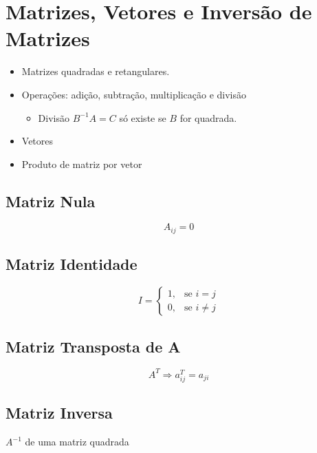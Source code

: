 \section{Matrizes, Vetores e Inversão de Matrizes}

\begin{itemize}

\item Matrizes quadradas e retangulares.

\item Operações: adição, subtração, multiplicação e divisão

\begin{itemize}
 \item Divisão $B^{-1}A = C$ só existe se $B$ for quadrada.
\end{itemize}

\item Vetores

\item Produto de matriz por vetor

\end{itemize}

\subsection{Matriz Nula}

\[ A_{ij} = 0\]

\subsection{Matriz Identidade}

\[
  I =
  \left\{
    \begin{array}{ll}
      1, & \mbox{se $i = j$} \\
      0, & \mbox{se $i \neq j$}
    \end{array}
  \right.  %
\]

\subsection{Matriz Transposta de A}

\[ A^{T} \Rightarrow a^{T}_{ij} = a_{ji} \]

\subsection{Matriz Inversa}

$A^{-1}$ de uma matriz quadrada

